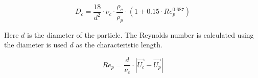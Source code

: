 \begin{equation}
    \label{eq:solidParticleDrag}        
    D_c = \frac{18}{d^2} \cdot \nu_c \cdot \frac{\rho_c}{\rho_p} 
        \cdot (1 + 0.15 \cdot Re_p^{0.687})
\end{equation}

Here $d$ is the diameter of the particle. The Reynolds number is calculated using the diameter is used $d$ as the characteristic length.

\begin{equation}
    \label{eq:solidParticleRe}
    Re_p = \frac{d}{\nu_c} \cdot | \vec{U_c} - \vec{U_p} |
\end{equation}
